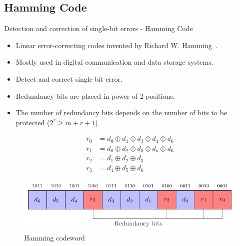 \subsection{Hamming Code}
    \begin{frame}{Detection and correction of single-bit errors - Hamming Code}
        \begin{block}{}
            \begin{itemize}
                \justifying
                \item Linear error-correcting codes invented by Richard W. Hamming~\cite{H-50-bstj}.
                \item Mostly used in digital communication and data storage systems.
                \item Detect and correct single-bit error.
                \item Redundancy bits are placed in power of 2 positions.
                \item The number of redundancy bits depends on the number of bits to be protected {\scriptsize ($ 2^r \ge m + r + 1 $)}
            \end{itemize}
        \end{block}

        \begin{minipage}[c]{0.4\linewidth}
            \begin{equation} \label{equat:hamming_encoder}
                \begin{split}
                    r_{0} &= d_{0} \oplus d_{1} \oplus d_{3} \oplus d_{4} \oplus d_{6} \\
                    r_{1} &= d_{0} \oplus d_{2} \oplus d_{3} \oplus d_{5} \oplus d_{6} \\
                    r_{2} &= d_{1} \oplus d_{2} \oplus d_{3} \\
                    r_{3} &= d_{4} \oplus d_{5} \oplus d_{6}
                \end{split}
            \end{equation}
        \end{minipage}\hfill%
        \begin{minipage}[c]{0.55\linewidth}
            \begin{figure}
                \centering
                \includegraphics[width=\textwidth, page=1]{src/4_strategies/img/hamming_bit.pdf}
                \caption{Hamming codeword}
                \label{fig:hamming_codeword}
            \end{figure}
        \end{minipage}
    \end{frame}
    
